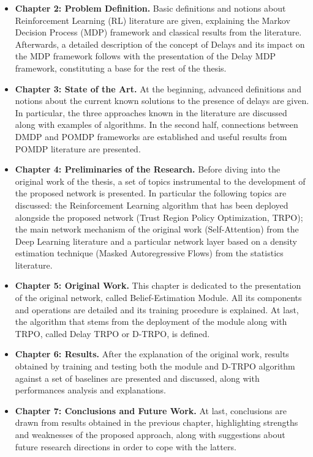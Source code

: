     \begin{itemize}
        \setlength\itemsep{0.05em}
        \item\textbf{Chapter 2: Problem Definition.} Basic definitions and notions about Reinforcement Learning (RL) literature are given, explaining the Markov Decision Process (MDP) framework and classical results from the literature. Afterwards, a detailed description of the concept of Delays and its impact on the MDP framework follows with the presentation of the Delay MDP framework, constituting a base for the rest of the thesis.
        \item\textbf{Chapter 3: State of the Art.} At the beginning, advanced definitions and notions about the current known solutions to the presence of delays are given. In particular, the three approaches known in the literature are discussed along with examples of algorithms. In the second half, connections between DMDP and POMDP frameworks are established and useful results from POMDP literature are presented. 
        \item\textbf{Chapter 4: Preliminaries of the Research.} Before diving into the original work of the thesis, a set of topics instrumental to the development of the proposed network is presented. In particular the following topics are discussed: the Reinforcement Learning algorithm that has been deployed alongside the proposed network (Trust Region Policy Optimization, TRPO); the main network mechanism of the original work (Self-Attention) from the Deep Learning literature and a particular network layer based on a density estimation technique (Masked Autoregressive Flows) from the statistics literature.
        \item\textbf{Chapter 5: Original Work.} This chapter is dedicated to the presentation of the original network, called Belief-Estimation Module. All its components and operations are detailed and its training procedure is explained. At last, the algorithm that stems from the deployment of the module along with TRPO, called Delay TRPO or D-TRPO, is defined. 
        \item\textbf{Chapter 6: Results.} After the explanation of the original work, results obtained by training and testing both the module and D-TRPO algorithm against a set of baselines are presented and discussed, along with performances analysis and explanations.
        \item\textbf{Chapter 7: Conclusions and Future Work.} At last, conclusions are drawn from results obtained in the previous chapter, highlighting strengths and weaknesses of the proposed approach, along with suggestions about future research directions in order to cope with the latters.
    \end{itemize}